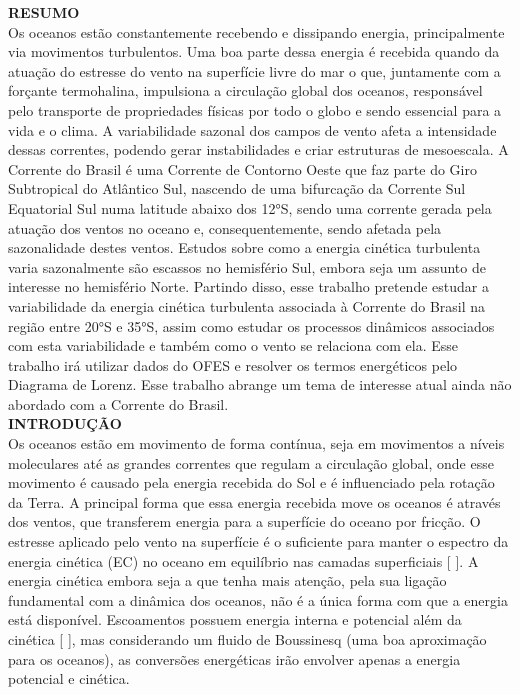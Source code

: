 \documentclass[portuguese,12pt,a4paper]{article}
\begin{document}
 

	

\newpage
{}
\textbf{RESUMO}\\

Os oceanos estão constantemente recebendo e dissipando energia, principalmente via
movimentos turbulentos. Uma boa parte dessa energia é recebida quando da atuação
do estresse do vento na superfície livre do mar o que, juntamente com a forçante
termohalina, impulsiona a circulação global dos oceanos, responsável pelo transporte
de propriedades físicas por todo o globo e sendo essencial para a vida e o clima. A
variabilidade sazonal dos campos de vento afeta a intensidade dessas correntes,
podendo gerar instabilidades e criar estruturas de mesoescala. A Corrente do Brasil é
uma Corrente de Contorno Oeste que faz parte do Giro Subtropical do Atlântico Sul,
nascendo de uma bifurcação da Corrente Sul Equatorial Sul numa latitude abaixo dos
12°S, sendo uma corrente gerada pela atuação dos ventos no oceano e,
consequentemente, sendo afetada pela sazonalidade destes ventos. Estudos sobre
como a energia cinética turbulenta varia sazonalmente são escassos no hemisfério Sul,
embora seja um assunto de interesse no hemisfério Norte. Partindo disso, esse
trabalho pretende estudar a variabilidade da energia cinética turbulenta associada à
Corrente do Brasil na região entre 20°S e 35°S, assim como estudar os processos
dinâmicos associados com esta variabilidade e também como o vento se relaciona com
ela. Esse trabalho irá utilizar dados do OFES e resolver os termos
energéticos pelo Diagrama de Lorenz. Esse trabalho abrange um tema de interesse
atual ainda não abordado com a Corrente do Brasil.\\

\textbf{INTRODUÇÃO} \\

Os oceanos estão em movimento de forma contínua, seja em movimentos a níveis
moleculares até as grandes correntes que regulam a circulação global, onde esse
movimento é causado pela energia recebida do Sol e é influenciado pela rotação da
Terra. A principal forma que essa energia recebida move os oceanos é através dos
ventos, que transferem energia para a superfície do oceano por fricção. O estresse
aplicado pelo vento na superfície é o suficiente para manter o espectro da energia
cinética (EC) no oceano em equilíbrio nas camadas superficiais [ \citeyear{ferrari2009ocean}]. A energia cinética embora seja a que tenha mais atenção, pela sua ligação fundamental com a dinâmica dos oceanos, não é a única forma com que a energia está disponível. Escoamentos possuem energia interna e potencial além da cinética [ \citeyear{vallis2006atmospheric}], mas considerando um fluido de Boussinesq (uma boa aproximação para os oceanos), as conversões energéticas irão envolver apenas a energia potencial e cinética.
\end{document}
